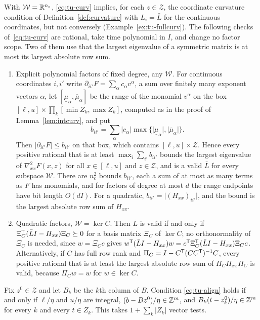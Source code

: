 \begin{remark}\label{rem:tu-curv}
With $\mathcal W=\mathbb R^{n_c}$, \eqref{eq:tu-curv} implies, for each
$z\in\mathcal Z$, the coordinate curvature condition of
Definition~\ref{def:curvature} with $L_i=\bar L$ for the continuous
coordinates, but not conversely (Example~\ref{ex:tu-fullcurv}). The following
checks of~\eqref{eq:tu-curv} are rational, take time polynomial in $I$, and
change no factor scope. Two of them use that the largest eigenvalue of a
symmetric matrix is at most its largest absolute row sum.
\begin{enumerate}[label=(\roman*)]
\item Explicit polynomial factors of fixed degree, any $\mathcal W$. For
continuous coordinates $i,i'$ write $\partial_{ii'}F=\sum_\alpha c_\alpha v^\alpha$,
a sum over finitely many exponent vectors $\alpha$, let
$[\underline\mu_\alpha,\overline\mu_\alpha]$ be the range of the monomial
$v^\alpha$ on the box $[\ell,u]\times\prod_k[\min Z_k,\max Z_k]$,
computed as in the proof of Lemma~\ref{lem:intcurv}, and put
\[
b_{ii'}=\sum_\alpha\lvert c_\alpha\rvert\max\bigl\{\lvert\underline\mu_\alpha\rvert,\lvert\overline\mu_\alpha\rvert\bigr\}.
\]
Then $\lvert\partial_{ii'}F\rvert\le b_{ii'}$ on that box, which contains
$[\ell,u]\times\mathcal Z$. Hence every positive rational that is at least
$\max_i\sum_{i'}b_{ii'}$ bounds the largest eigenvalue of
$\nabla^2_{xx}F(x,z)$ for all $x\in[\ell,u]$ and $z\in\mathcal Z$, and is a
valid $\bar L$ for every subspace $\mathcal W$. There are $n_c^2$ bounds
$b_{ii'}$, each a sum of at most as many terms as $F$ has monomials, and for
factors of degree at most $d$ the range endpoints have bit length $O(dI)$.
For a quadratic,
$b_{ii'}=\lvert(H_{xx})_{ii'}\rvert$, and the bound is the largest absolute
row sum of $H_{xx}$.
\item Quadratic factors, $\mathcal W=\ker C$. Then $\bar L$ is valid if and
only if $\Xi_C^{\mathsf T}(\bar LI-H_{xx})\Xi_C\succeq0$ for a basis matrix $\Xi_C$
of $\ker C$; no orthonormality of $\Xi_C$ is needed, since $w=\Xi_Cc$ gives
$w^{\mathsf T}(\bar LI-H_{xx})w=c^{\mathsf T}\Xi_C^{\mathsf T}(\bar LI-H_{xx})\Xi_Cc$.
Alternatively, if $C$ has full row rank and
$\Pi_C=I-C^{\mathsf T}(CC^{\mathsf T})^{-1}C$, every positive rational that is at least
the largest absolute row sum of $\Pi_CH_{xx}\Pi_C$ is valid, because
$\Pi_Cw=w$ for $w\in\ker C$.
\end{enumerate}
\end{remark}

\begin{proposition}\label{prop:tu-align}
Fix $z^0\in\mathcal Z$ and let $B_k$ be the $k$th column of $B$. Condition
\eqref{eq:tu-align} holds if and only if $\ell/\eta$ and $u/\eta$ are integral,
$(b-Bz^0)/\eta\in\mathbb Z^m$, and $B_k(t-z^0_k)/\eta\in\mathbb Z^m$ for every $k$ and
every $t\in Z_k$. This takes $1+\sum_k\lvert Z_k\rvert$ vector tests.
\end{proposition}

